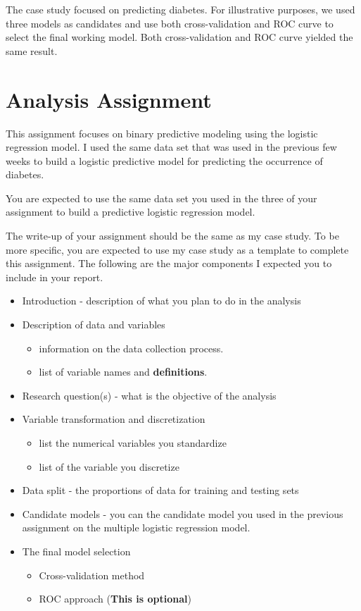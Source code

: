 \documentclass[
]{book}
\begin{document}
The case study focused on predicting diabetes. For illustrative purposes, we used three models as candidates and use both cross-validation and ROC curve to select the final working model. Both cross-validation and ROC curve yielded the same result.

\hypertarget{analysis-assignment-2}{%
\section{Analysis Assignment}\label{analysis-assignment-2}}

This assignment focuses on binary predictive modeling using the logistic regression model. I used the same data set that was used in the previous few weeks to build a logistic predictive model for predicting the occurrence of diabetes.

You are expected to use the same data set you used in the three of your assignment to build a predictive logistic regression model.

The write-up of your assignment should be the same as my case study. To be more specific, you are expected to use my case study as a template to complete this assignment. The following are the major components I expected you to include in your report.

\begin{itemize}
\item
  Introduction - description of what you plan to do in the analysis
\item
  Description of data and variables

  \begin{itemize}
  \item
    information on the data collection process.
  \item
    list of variable names and \textbf{definitions}.
  \end{itemize}
\item
  Research question(s) - what is the objective of the analysis
\item
  Variable transformation and discretization

  \begin{itemize}
  \item
    list the numerical variables you standardize
  \item
    list of the variable you discretize
  \end{itemize}
\item
  Data split - the proportions of data for training and testing sets
\item
  Candidate models - you can the candidate model you used in the previous assignment on the multiple logistic regression model.
\item
  The final model selection

  \begin{itemize}
  \item
    Cross-validation method
  \item
    ROC approach (\textbf{This is optional})
  \end{itemize}
\end{itemize}
\end{document}

